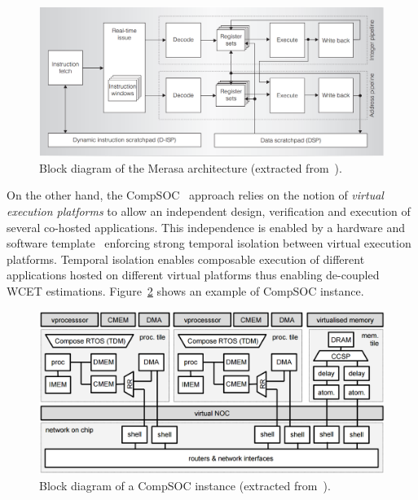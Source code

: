 \documentclass[main.tex]{subfiles}
\begin{document}
\begin{figure}
    \centering
    \includegraphics[width=13cm]{imgs/png/stateOfTheArt_MERASAarchi.png}
    \caption{Block diagram of the Merasa architecture (extracted
    from~\cite{Merasa}).}
    \label{fig_stateOfTheArt_MERASAarchi}
\end{figure}


On the other hand, the CompSOC~\cite{Goossens2013} approach relies on the
notion of \emph{virtual execution platforms} to allow an independent design,
verification and execution of several co-hosted applications. This independence
is enabled by a hardware and software template~\cite{Hansson2009} enforcing
strong temporal isolation between virtual execution platforms. Temporal
isolation enables composable execution of different applications hosted on
different virtual platforms thus enabling de-coupled WCET estimations.
Figure~\ref{fig_stateOfTheArt_COMPSOCarchi} shows an example of CompSOC
instance. \\

\begin{figure}
    \centering
    \includegraphics[width=13cm]{imgs/png/stateOfTheArt_COMPSOCarchi.png}
    \caption{Block diagram of a CompSOC instance (extracted
    from~\cite{Goossens2013}).}
    \label{fig_stateOfTheArt_COMPSOCarchi}
\end{figure}
\end{document}
